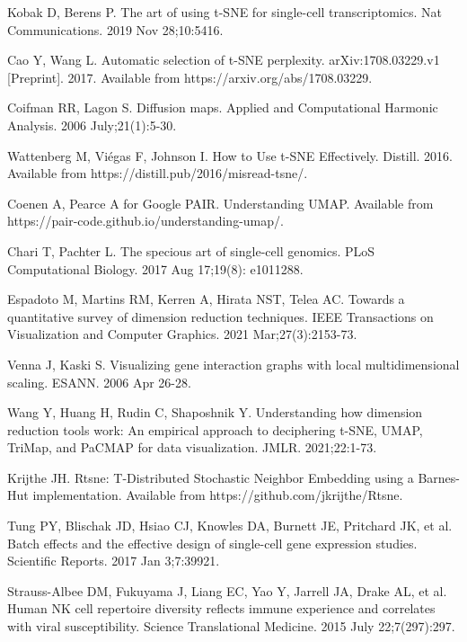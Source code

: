 \documentclass[10pt,letterpaper]{article}
\begin{document}
\begin{thebibliography}{10}
Kobak D, Berens P.
\newblock The art of using t-SNE for single-cell transcriptomics.
\newblock Nat Communications. 2019 Nov 28;10:5416.

Cao Y, Wang L. 
\newblock Automatic selection of t-SNE perplexity.
\newblock arXiv:1708.03229.v1 [Preprint]. 2017. Available from https://arxiv.org/abs/1708.03229.

Coifman RR, Lagon S.
\newblock Diffusion maps.
\newblock Applied and Computational Harmonic Analysis. 2006 July;21(1):5-30.

Wattenberg M, Vi\'egas F, Johnson I.
\newblock How to Use t-SNE Effectively.
\newblock Distill. 2016. Available from https://distill.pub/2016/misread-tsne/.

Coenen A, Pearce A for Google PAIR.
\newblock Understanding UMAP.
\newblock Available from https://pair-code.github.io/understanding-umap/.

Chari T, Pachter L.
\newblock The specious art of single-cell genomics.
\newblock PLoS Computational Biology. 2017 Aug 17;19(8): e1011288.

Espadoto M, Martins RM, Kerren A, Hirata NST, Telea AC.
\newblock Towards a quantitative survey of dimension reduction techniques.
\newblock  IEEE Transactions on Visualization and Computer Graphics. 2021 Mar;27(3):2153-73.

Venna J, Kaski S.
\newblock Visualizing gene interaction graphs with local multidimensional scaling.
\newblock ESANN. 2006 Apr 26-28.

Wang Y, Huang H, Rudin C, Shaposhnik Y.
\newblock Understanding how dimension reduction tools work: An empirical approach to deciphering t-SNE, UMAP, TriMap, and PaCMAP for data visualization.
\newblock JMLR. 2021;22:1-73.

Krijthe JH.
\newblock Rtsne: T-Distributed Stochastic Neighbor Embedding using a Barnes-Hut implementation.
\newblock Available from https://github.com/jkrijthe/Rtsne.

Tung PY, Blischak JD, Hsiao CJ, Knowles DA, Burnett JE, Pritchard JK, et al.
\newblock Batch effects and the effective design of single-cell gene expression studies.
\newblock Scientific Reports. 2017 Jan 3;7:39921.

Strauss-Albee DM, Fukuyama J, Liang EC, Yao Y, Jarrell JA, Drake AL, et al.
\newblock Human NK cell repertoire diversity reflects immune experience and correlates with viral susceptibility.
\newblock Science Translational Medicine. 2015 July 22;7(297):297.


\end{thebibliography}
\end{document}

